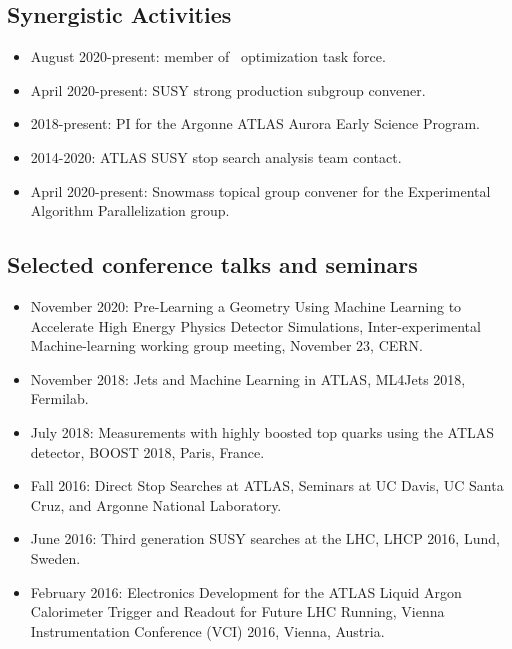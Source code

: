 \documentclass[letter, USenglish, 11pt, subfigure]{article}
\begin{document}
\subsection{Synergistic Activities}
\label{subsec:syn}
\begin{itemize}
\item August 2020-present: member of \GEANT\ optimization task force. %
\item April 2020-present: SUSY strong production subgroup convener. %
\item 2018-present: PI for the Argonne ATLAS Aurora Early Science Program.
\item 2014-2020: ATLAS SUSY stop search analysis team contact.
\item April 2020-present: Snowmass topical group convener for the Experimental Algorithm Parallelization group.
\end{itemize}

\subsection{Selected conference talks and seminars}
\begin{itemize}
\item November 2020: Pre-Learning a Geometry Using Machine Learning to Accelerate High Energy Physics Detector Simulations, Inter-experimental Machine-learning working group meeting, November 23, CERN.
\item November 2018: Jets and Machine Learning in ATLAS, ML4Jets 2018, Fermilab.
\item July 2018: Measurements with highly boosted top quarks using the ATLAS detector, BOOST 2018, Paris, France.
\item Fall 2016: Direct Stop Searches at ATLAS, Seminars at UC Davis, UC Santa Cruz, and Argonne National Laboratory.
\item June 2016: Third generation SUSY searches at the LHC, LHCP 2016, Lund, Sweden.
\item February 2016: Electronics Development for the ATLAS Liquid Argon Calorimeter Trigger and Readout for Future LHC Running, Vienna Instrumentation Conference (VCI) 2016, Vienna, Austria.
\end{itemize}
\end{document}

